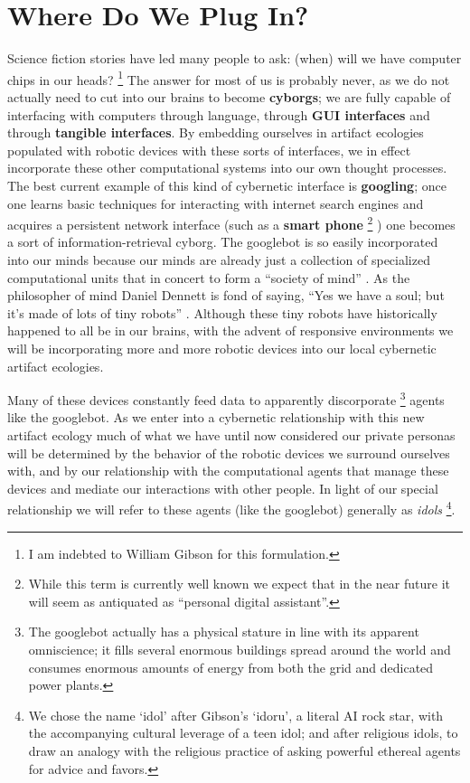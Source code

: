 \section{Where Do We Plug In?}
%
Science fiction stories have led many people to ask: (when) will we have computer chips in our heads?%
\footnote{I am indebted to William Gibson \citeyearpar{gibson_distrust} for this formulation.} 
The answer for most of us is probably never, as we do not actually need to cut into our brains to become \textbf{cyborgs}; we are fully capable of interfacing with computers through language, through \textbf{GUI interfaces} and through \textbf{tangible interfaces}.
By embedding ourselves in artifact ecologies populated with robotic devices with these sorts of interfaces, we in effect incorporate these other computational systems into our own thought processes.
The best current example of this kind of cybernetic interface is \textbf{googling}; once one learns basic techniques for interacting with internet search engines and acquires a persistent network interface (such as a \textbf{smart phone}%
\footnote{While this term is currently well known we expect that in the near future it will seem as antiquated as ``personal digital assistant''.}
) one becomes a sort of information-retrieval cyborg.
The googlebot is so easily incorporated into our minds because our minds are already just a collection of specialized computational units that in concert to form a ``society of mind'' \citep{society_of_mind}. 
As the philosopher of mind Daniel Dennett is fond of saying, ``Yes we have a soul; but it's made of lots of tiny robots'' \citeyearpar[][p. 1]{freedom_evolves}. Although these tiny robots have historically happened to all be in our brains, with the advent of responsive environments we will be incorporating more and more robotic devices into our local cybernetic artifact ecologies.

Many of these devices constantly feed data to apparently discorporate%
\footnote{The googlebot actually has a physical stature in line with its apparent omniscience; it fills several enormous buildings spread around the world and consumes enormous amounts of energy from both the grid and dedicated power plants.}
agents like the googlebot.
As we enter into a cybernetic relationship with this new artifact ecology much of what we have until now considered our private personas will be determined by the behavior of the robotic devices we surround ourselves with, and by our relationship with the computational agents that manage these devices and mediate our interactions with other people. 
In light of our special relationship we will refer to these agents (like the googlebot) generally as \emph{idols}%
\footnote{We chose the name `idol' after Gibson's `idoru'\citeyearpar{gibson_idoru}, a literal AI rock star, with the accompanying cultural leverage of a teen idol; and after religious idols, to draw an analogy with the religious practice of asking powerful ethereal agents for advice and favors.}.

